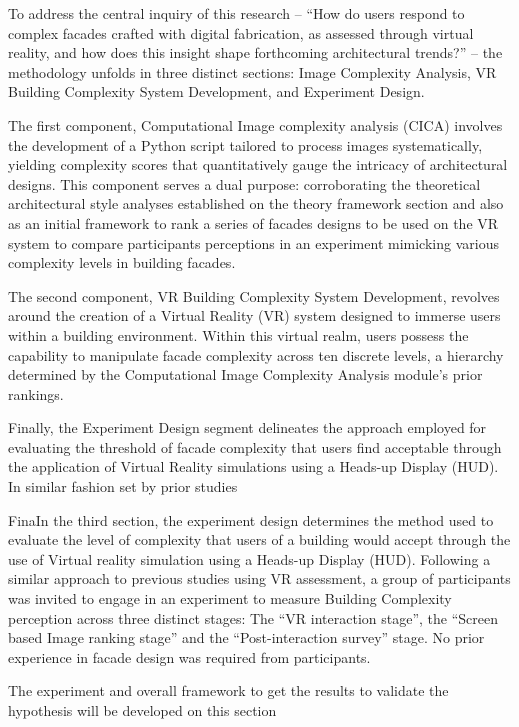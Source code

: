 
To address the central inquiry of this research – ``How do users respond to complex facades crafted with digital fabrication, as assessed through virtual reality, and how does this insight shape forthcoming architectural trends?'' – the methodology unfolds in three distinct sections: Image Complexity Analysis, VR Building Complexity System Development, and Experiment Design.

The first component, Computational Image complexity analysis (CICA) involves the development of a Python script tailored to process images systematically, yielding complexity scores that quantitatively gauge the intricacy of architectural designs.
This component serves a dual purpose: corroborating the theoretical architectural style analyses established on the theory framework section and also as an initial framework to rank a series of facades designs to be used on the VR system to compare participants perceptions in an experiment mimicking various complexity levels in building facades.

The second component, VR Building Complexity System Development, revolves around the creation of a Virtual Reality (VR) system designed to immerse users within a building environment.
Within this virtual realm, users possess the capability to manipulate facade complexity across ten discrete levels, a hierarchy determined by the Computational Image Complexity Analysis module's prior rankings.

Finally, the Experiment Design segment delineates the approach employed for evaluating the threshold of facade complexity that users find acceptable through the application of Virtual Reality simulations using a Heads-up Display (HUD).
In similar fashion set by prior studies\cite{Wolfartsberger2019}

FinaIn the third section, the experiment design determines the method used to evaluate the level of complexity that users of a building would accept through the use of Virtual reality simulation using a Heads-up Display (HUD).
Following a similar approach to previous studies using VR assessment\cite{Wolfartsberger2019}, a group of participants was invited to engage in an experiment to measure Building Complexity perception across three distinct stages: The ``VR interaction stage'', the ``Screen based Image ranking stage'' and the ``Post-interaction survey'' stage.
No prior experience in facade design was required from participants.

The experiment and overall framework to get the results to validate the hypothesis will be developed on this section

